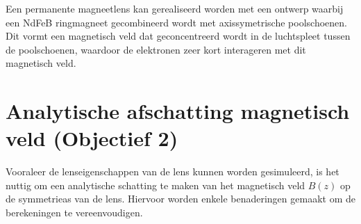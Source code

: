 \documentclass[we,twoside,openright,a4paper,11pt]{uantwerpenbamathesis}
\begin{document}


\begin{tcolorbox}[colback=blue!10!white, colframe=blue!40!white, sharp corners,title=Realisatie objectief 1]
    Een permanente magneetlens kan gerealiseerd worden met een ontwerp waarbij een NdFeB ringmagneet gecombineerd wordt met axissymetrische poolschoenen. Dit vormt een magnetisch veld dat geconcentreerd wordt in de luchtspleet tussen de poolschoenen, waardoor de elektronen zeer kort interageren met dit magnetisch veld.
\end{tcolorbox}

\section{Analytische afschatting magnetisch veld (Objectief 2)}
Vooraleer de lenseigenschappen van de lens kunnen worden gesimuleerd, is het nuttig om een analytische schatting te maken van het magnetisch veld $B(z)$ op de symmetrieas van de lens. Hiervoor worden enkele benaderingen gemaakt om de berekeningen te vereenvoudigen.\\
\end{document}
